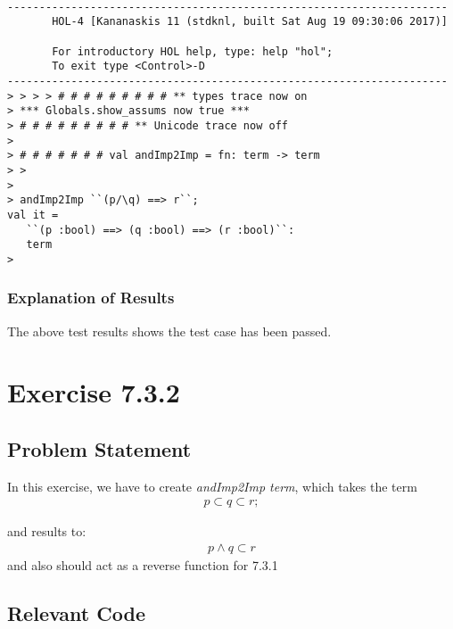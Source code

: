 \documentclass{report}
\begin{document}
\setcounter{sessioncount}{0}
\begin{session}
  \begin{scriptsize}
\begin{verbatim}

---------------------------------------------------------------------
       HOL-4 [Kananaskis 11 (stdknl, built Sat Aug 19 09:30:06 2017)]

       For introductory HOL help, type: help "hol";
       To exit type <Control>-D
---------------------------------------------------------------------
> > > > # # # # # # # # # ** types trace now on
> *** Globals.show_assums now true ***
> # # # # # # # # # ** Unicode trace now off
> 
> # # # # # # # val andImp2Imp = fn: term -> term
> > 
> 
> andImp2Imp ``(p/\q) ==> r``;
val it =
   ``(p :bool) ==> (q :bool) ==> (r :bool)``:
   term
> 
\end{verbatim}
  \end{scriptsize}
\end{session}

\subsection{Explanation of Results}
\label{sec:explanation-results-1}
The above test results shows the test case has been passed.


\chapter{Exercise 7.3.2}
\label{cha:exercise-7.3.2}

\section{Problem Statement}
\label{sec:problem-statement-2}
In this exercise, we have to create \emph{andImp2Imp term}, which takes the term 
\begin{align*}
p \subset q \subset r;
\end{align*}

and results to:
\begin{align*}
p\wedge q \subset r
\end{align*} and also should act as a reverse function for 7.3.1

\section{Relevant Code}
\label{sec:relevant-code-2}
\end{document}
